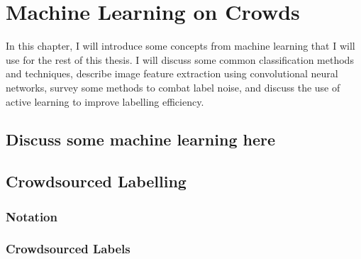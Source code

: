 \chapter{Machine Learning on Crowds}

 In this chapter, I will introduce some
concepts from machine learning that I will use for the rest of this thesis. I
will discuss some common classification methods and techniques, describe image
feature extraction using convolutional neural networks, survey some methods to
combat label noise, and discuss the use of active learning to improve labelling
efficiency.

\section{Discuss some machine learning here}

\section{Crowdsourced Labelling}
\label{sec:crowd-labels}

    \subsection{Notation}


    \subsection{Crowdsourced Labels}
        
